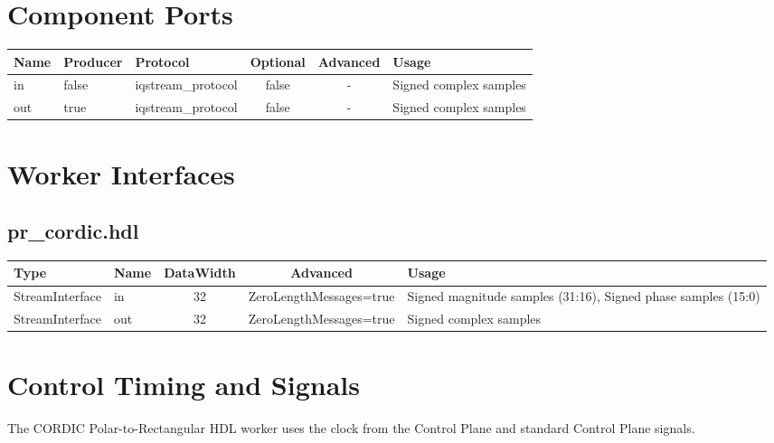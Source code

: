 \documentclass{article}
\def\comp{pr\_cordic}
\begin{document}
\begin{landscape}
	\section*{Component Ports}
	\begin{scriptsize}
		\begin{tabular}{|M{2cm}|M{1.5cm}|M{4cm}|c|c|M{9cm}|}
			\hline
			Name & Producer & Protocol           & Optional & Advanced & Usage                  \\
			\hline
			in   & false    & iqstream\_protocol & false    & -        & Signed complex samples \\
			\hline
			out  & true     & iqstream\_protocol & false    & -        & Signed complex samples \\
			\hline
		\end{tabular}
	\end{scriptsize}

	\section*{Worker Interfaces}
	\subsection*{\comp.hdl}
	\begin{scriptsize}
		\begin{tabular}{|M{2cm}|M{1.5cm}|c|c|M{12cm}|}
			\hline
			\rowcolor{blue}
			Type            & Name & DataWidth & Advanced 					 & Usage                  \\
			\hline
			StreamInterface & in   & 32        & ZeroLengthMessages=true   & Signed magnitude samples (31:16), Signed phase samples (15:0) \\
			\hline
			StreamInterface & out  & 32        & ZeroLengthMessages=true   & Signed complex samples \\
			\hline
		\end{tabular}
	\end{scriptsize}
\end{landscape}

\section*{Control Timing and Signals}
\begin{flushleft}
	The CORDIC Polar-to-Rectangular HDL worker uses the clock from the Control Plane and standard Control Plane signals.
\end{flushleft}
\end{document}
